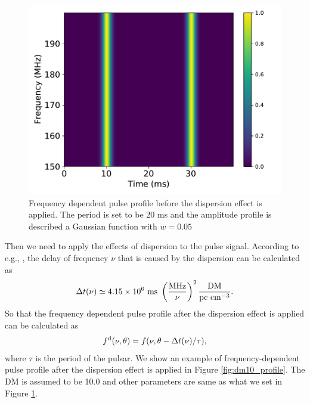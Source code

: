 \documentclass[fleqn,usenatbib]{mnras}
\begin{document}
\begin{figure}
    \centering
    \includegraphics[width=0.9\columnwidth]{dm0_profile.pdf}
    \caption{Frequency dependent pulse profile before the dispersion effect is applied. 
    The period is set to be 20 ms and the amplitude profile is described a Gaussian function with $w=0.05$}
    \label{fig:dm0_profile}
 \end{figure}
 
 Then we need to apply the effects of dispersion to the pulse signal. According to e.g., \citet{2012hpa..book.....L}, the delay of frequency $\nu$ that is caused by the dispersion can be calculated as 
 \begin{gather}
     \Delta t(\nu)\simeq 4.15\times 10^6~{\rm ms}~\left(\frac{{\rm MHz}}{\nu}\right)^2\frac{\rm DM}{\rm pc~cm^{-3}}.
 \end{gather}
 So that the frequency dependent pulse profile after the dispersion effect is applied can be calculated as
 \begin{gather}
     f^{\rm d}(\nu, \theta)=f(\nu, \theta-\Delta t(\nu)/\tau),
 \end{gather}
where $\tau$ is the period of the pulsar. 
We show an example of frequency-dependent pulse profile after the dispersion effect is applied in Figure \ref{fig:dm10_profile}. The DM is assumed to be 10.0 and other parameters are same as what we set in Figure \ref{fig:dm0_profile}.
\end{document}

